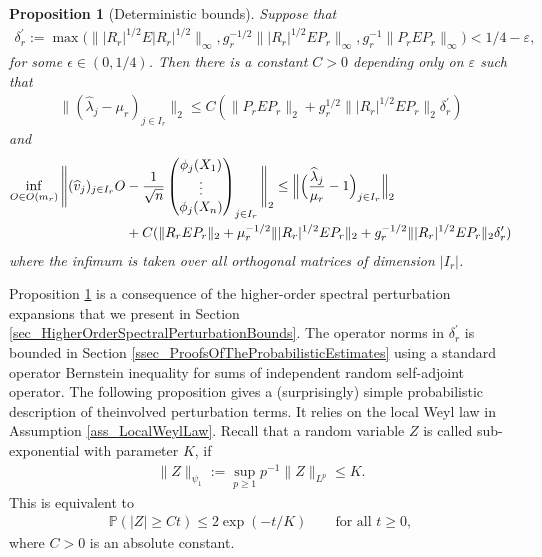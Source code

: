 \documentclass[a4paper,11pt]{article} %
\numberwithin{equation}{section}
\theoremstyle{definition}
\theoremstyle{remark}
\theoremstyle{plain}
\newtheorem{proposition}[definition]{Proposition}
\begin{document}
\begin{proposition}[Deterministic bounds]%
  \label{prp_DeterministicBounds}
   Suppose that
   \begin{align}
                   \delta_r^\prime:= \max\big(\| |R_{r}|^{1/2} E |R_{r}|^{1/2} \|_{\infty}, g_{r}^{-1/2} \| |R_{r}|^{1/2} E  P_{r}        \|_{\infty}
                , g_{r}^{-1} \| P_{r} E P_{r} \|_{\infty}\big)< 1 / 4 - \varepsilon , 
  \end{align}
  for some $\epsilon\in(0,1/4)$. Then there is a constant $C>0$ depending only on $\varepsilon$ such that 
  \begin{align}
          \|(\widehat\lambda_j-\mu_r)_{j\in I_r}\|_{2}
    \leq
          C ( \| P_{r} E P_{r} \|_{2} + g_r^{1/2}\| | R_{r} |^{1/2} E P_{r} \|_{2}\delta_r^\prime)
  \end{align}
  and
  \begin{align}
    \inf_{O \in O(m_r)} 
    \Bigg\| (\widehat v_j)_{j \in I_r} O&- \frac{1}{\sqrt{n}}  \begin{pmatrix}
                                                          \phi_j(X_1) \\
                                                          \vdots      \\
                                                          \phi_j(X_n) 
                                                        \end{pmatrix}_{j \in I_r}  
    \Bigg\|_2
    \leq 
     \Big\| \Big(\frac{\widehat{\lambda}_{j}}{\mu_r} - 1\Big)_{j \in I_{r}} \Big\|_{2}\\
    &+C(\|  R_{r} E P_{r} \|_{2}+\mu_r^{-1/2}\| |R_{r}|^{1/2} E P_{r} \|_{2}+g_r^{-1/2}\| | R_{r} |^{1/2} E P_{r} \|_{2}\delta_r^\prime)
    \notag
  \end{align}
  where the infimum is taken over all orthogonal matrices of dimension $|I_r|$.
\end{proposition}%

Proposition \ref{prp_DeterministicBounds} is a consequence of the higher-order spectral perturbation expansions that we present in Section \ref{sec_HigherOrderSpectralPerturbationBounds}. The operator norms in $\delta_r^\prime$ is bounded in Section \ref{ssec_ProofsOfTheProbabilisticEstimates} using a standard operator Bernstein inequality for sums of independent random self-adjoint operator. The following proposition gives a (surprisingly) simple probabilistic description of theinvolved perturbation terms. It relies on the local Weyl law in Assumption \ref{ass_LocalWeylLaw}. Recall that a random variable $Z$ is called sub-exponential with parameter $K$, if 
\begin{align}
  \|Z\|_{\psi_1}:=\sup_{p\geq 1}p^{-1}\|Z\|_{L^p}\leq  K. 
\end{align}
This is equivalent to 
\begin{align}
 \mathbb{P}(|Z|\geq Ct)\leq 2\exp(-t/K)\qquad  \text{for all }t\geq 0,
\end{align}
where $C>0$ is an absolute constant.
\end{document}
